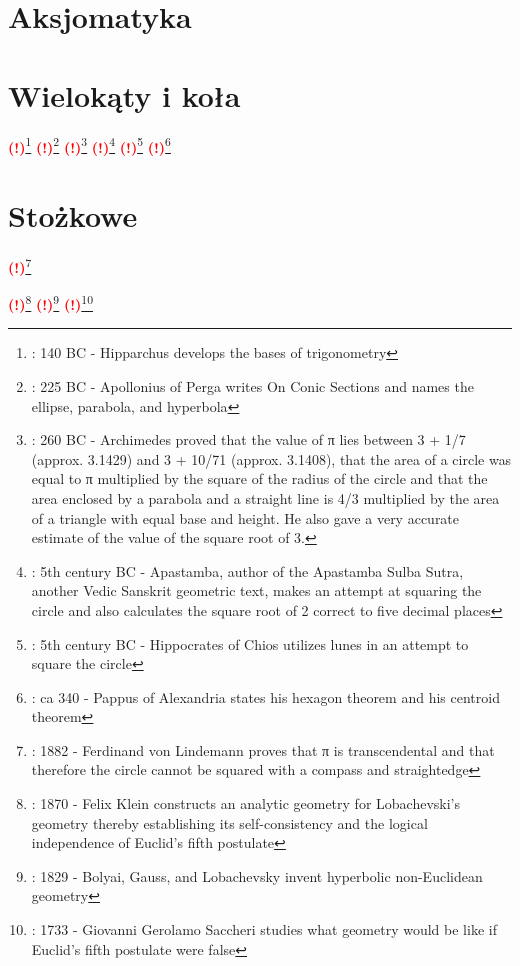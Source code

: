\documentclass{greaseproof}
\newcommand{\todofoot}[1]{\textcolor{red}{\textbf{(!)}\footnote{\textbf{\color{red}{Do zrobienia}}: #1}}}
\begin{document}


\chapter{Aksjomatyka}




\chapter{Wielokąty i koła}


\todofoot{140 BC - Hipparchus develops the bases of trigonometry}
\todofoot{225 BC - Apollonius of Perga writes On Conic Sections and names the ellipse, parabola, and hyperbola}
\todofoot{260 BC - Archimedes proved that the value of π lies between 3 + 1/7 (approx. 3.1429) and 3 + 10/71 (approx. 3.1408), that the area of a circle was equal to π multiplied by the square of the radius of the circle and that the area enclosed by a parabola and a straight line is 4/3 multiplied by the area of a triangle with equal base and height. He also gave a very accurate estimate of the value of the square root of 3.}
\todofoot{5th century BC - Apastamba, author of the Apastamba Sulba Sutra, another Vedic Sanskrit geometric text, makes an attempt at squaring the circle and also calculates the square root of 2 correct to five decimal places}
\todofoot{5th century BC - Hippocrates of Chios utilizes lunes in an attempt to square the circle}
\todofoot{ca 340 - Pappus of Alexandria states his hexagon theorem and his centroid theorem}




\chapter{Stożkowe}



\todofoot{1882 - Ferdinand von Lindemann proves that π is transcendental and that therefore the circle cannot be squared with a compass and straightedge}


\todofoot{1870 - Felix Klein constructs an analytic geometry for Lobachevski's geometry thereby establishing its self-consistency and the logical independence of Euclid's fifth postulate}
\todofoot{1829 - Bolyai, Gauss, and Lobachevsky invent hyperbolic non-Euclidean geometry}
\todofoot{1733 - Giovanni Gerolamo Saccheri studies what geometry would be like if Euclid's fifth postulate were false}
\end{document}
